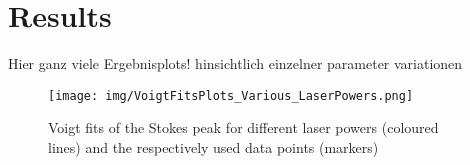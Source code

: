 \chapter{Results}
\label{sec:results}

Hier ganz viele Ergebnisplots!
hinsichtlich einzelner parameter variationen

\begin{figure}[htb]
  \centering  
  \texttt{[image: img/VoigtFitsPlots\_Various\_LaserPowers.png]}
  \caption{Voigt fits of the Stokes peak for different laser powers (coloured lines) and the respectively used data points (markers)}
  \label{fig:voigtfits}
\end{figure}

